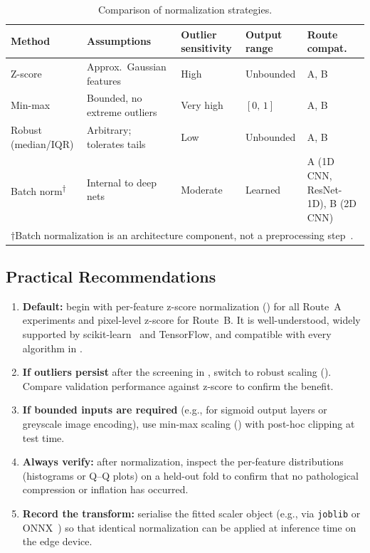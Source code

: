 \begin{table}[ht]
\centering
\caption{Comparison of normalization strategies.}
\label{tab:norm_comparison}
\small
\renewcommand{\arraystretch}{1.15}
\begin{tabular}{p{2.4cm} p{2.8cm} p{2.0cm} p{2.0cm} p{2.3cm}}
\toprule
\textbf{Method} &
\textbf{Assumptions} &
\textbf{Outlier sensitivity} &
\textbf{Output range} &
\textbf{Route compat.} \\
\midrule
Z-score &
  Approx.\ Gaussian features &
  High &
  Unbounded &
  A, B \\
Min-max &
  Bounded, no extreme outliers &
  Very high &
  $[0,\,1]$ &
  A, B \\
Robust (median/IQR) &
  Arbitrary; tolerates tails &
  Low &
  Unbounded &
  A, B \\
Batch norm\textsuperscript{$\dagger$} &
  Internal to deep nets &
  Moderate &
  Learned &
  A (1D CNN, ResNet-1D), B (2D CNN) \\
\bottomrule
\multicolumn{5}{l}{\footnotesize $\dagger$\;Batch normalization is an
  architecture component, not a preprocessing step~\cite{ioffe2015batchnorm}.}
\end{tabular}
\end{table}

\subsection{Practical Recommendations}
\label{sec:norm:recommendations}

\begin{enumerate}
  \item \textbf{Default:} begin with per-feature z-score normalization
        () for all Route~A experiments and pixel-level
        z-score for Route~B.  It is well-understood, widely supported by
        scikit-learn~\cite{sklearn_docs} and TensorFlow, and compatible
        with every algorithm in .

  \item \textbf{If outliers persist} after the screening in
        , switch to robust scaling
        ().  Compare validation performance against
        z-score to confirm the benefit.

  \item \textbf{If bounded inputs are required} (e.g., for sigmoid
        output layers or greyscale image encoding), use min-max scaling
        () with post-hoc clipping at test time.

  \item \textbf{Always verify:} after normalization, inspect the
        per-feature distributions (histograms or Q--Q plots) on a
        held-out fold to confirm that no pathological compression or
        inflation has occurred.

  \item \textbf{Record the transform:} serialise the fitted scaler
        object (e.g., via \texttt{joblib} or ONNX~\cite{onnx_runtime})
        so that identical normalization can be applied at inference time
        on the edge device.
\end{enumerate}
